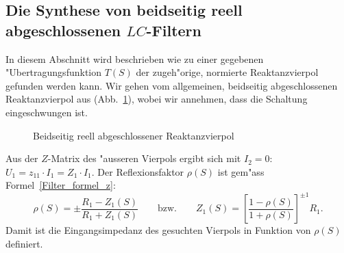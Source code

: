 \subsection{Die Synthese von beidseitig reell abgeschlossenen {\boldmath $LC$}-Filtern}
\label{synt-lc}
In diesem Abschnitt wird beschrieben wie zu einer gegebenen
"Ubertragungsfunktion $T(S)$ der zugeh"orige, normierte
Reaktanzvierpol gefunden werden kann.  Wir gehen vom allgemeinen,
beidseitig abgeschlossenen Reaktanz\-vier\-pol aus
(Abb.~\ref{abge-vierp}), wobei wir annehmen, dass die Schaltung eingeschwungen ist.
\begin{figure}[!htb]
\begin{center}
  \caption{Beidseitig reell abgeschlossener Reaktanzvierpol \label{abge-vierp}}
\end{center}
\vspace*{-6mm}
\end{figure}
Aus der $Z$-Matrix des "ausseren Vierpols ergibt sich mit $I_2=0$: $U_1
=z_{11} \cdot I_1=Z_1 \cdot I_1.$ Der Reflexionsfaktor
$\rho(S)$ ist gem"ass Formel~\ref{Filter_formel_z}:
\begin{equation*}
\rho(S)=\pm \frac{R_1-Z_1(S)}{R_1 + Z_1(S)}\qquad\text{bzw.}\qquad Z_1(S)=\left[ \frac{1-\rho(S)}{1 + \rho(S)} \right]^{\pm 1} R_1.
\end{equation*}
Damit ist die Eingangsimpedanz des gesuchten Vierpols in Funktion von
$\rho(S)$ definiert.\\
